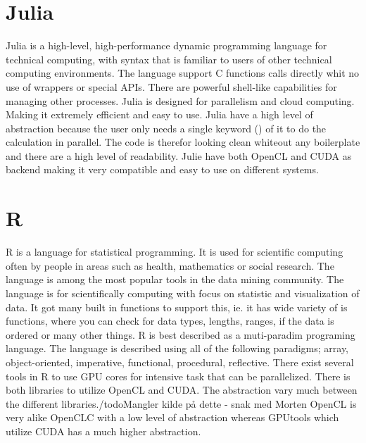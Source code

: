 \section{Julia}
Julia is a high-level, high-performance dynamic programming language for technical computing, with syntax that is familiar to users of other technical computing environments.
The language support C functions calls directly whit no use of wrappers or special APIs.
There are powerful shell-like capabilities for managing other processes.
Julia is designed for parallelism and cloud computing. 
Making it extremely efficient and easy to use.
Julia have a high level of abstraction because the user only needs a single keyword (\@parallel) of it to do the calculation in parallel.
The code is therefor looking clean whiteout any boilerplate and there are a high level of readability.
Julie have both OpenCL and CUDA as backend making it very compatible and easy to use on different systems.\citep{Julia_Git,Julia}

\section{R} %
R is a language for statistical programming.
It is used for scientific computing often by people in areas such as health, mathematics or social research.
The language is among the most popular tools in the data mining community\citep{R_datamining}.
The language is for scientifically computing with focus on statistic and visualization of data.
It got many built in functions to support this, ie. it has wide variety of is functions, where you can check for data types, lengths, ranges, if the data is ordered or many other things.
R is best described as a muti-paradim programing language.
The language is described using all of the following paradigms; array, object-oriented, imperative, functional, procedural, reflective.
There exist several tools in R to use GPU cores for intensive task that can be parallelized.
There is both libraries to utilize OpenCL and CUDA. 
The abstraction vary much between the different libraries./todo{Mangler kilde på dette - snak med Morten}
OpenCL is very alike OpenCLC with a low level of abstraction whereas GPUtools which utilize CUDA has a much higher abstraction.\citep{R_history,R_speed}

